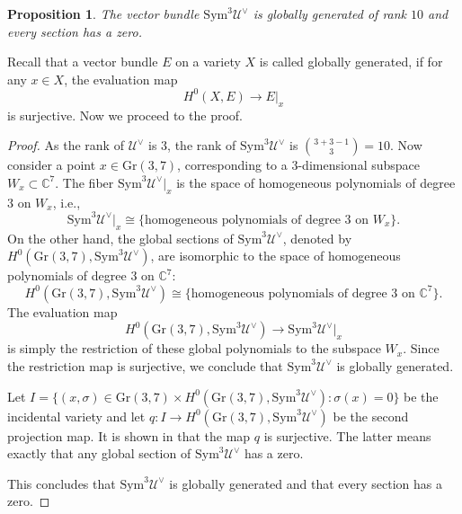 \documentclass{article}
\newtheorem{proposition}[theorem]{Proposition}
\theoremstyle{definition}
\begin{document}
\begin{proposition}\label{PropSym3UdualGloballyGenerated}
     The vector bundle $\mathrm{Sym}^3\mathcal U^\vee$ is {globally generated} of rank $10$ and every section has a zero.
\end{proposition}
Recall that a vector bundle $E$ on a variety $X$ is called globally generated, if for any $x\in X$, the evaluation map 
\[
H^0(X, E) \to E|_x
\]
is surjective. Now we proceed to the proof.
\begin{proof} As the rank of $\mathcal U^\vee$ is $3$, the rank of $\mathrm{Sym}^3\mathcal U^\vee$ is $\binom{3+3-1}{3}=10$.
Now consider a point \( x \in \mathrm{Gr}(3, 7) \), corresponding to a 3-dimensional subspace \( W_x \subset \mathbb{C}^7 \). The fiber \( \mathrm{Sym}^3 \mathcal{U}^\vee |_x \) is the space of homogeneous polynomials of degree 3 on \( W_x \), i.e.,
\[
\mathrm{Sym}^3 \mathcal{U}^\vee |_x \cong \{ \text{homogeneous polynomials of degree 3 on } W_x \}.
\]
On the other hand, the global sections of \( \mathrm{Sym}^3 \mathcal{U}^\vee \), denoted by \( H^0(\mathrm{Gr}(3,7), \mathrm{Sym}^3 \mathcal{U}^\vee) \), are isomorphic to the space of homogeneous polynomials of degree 3 on \( \mathbb{C}^7 \):
\[
H^0(\mathrm{Gr}(3,7), \mathrm{Sym}^3 \mathcal{U}^\vee) \cong \{ \text{homogeneous polynomials of degree 3 on } \mathbb{C}^7 \}.
\]
The evaluation map
\[
H^0(\mathrm{Gr}(3,7), \mathrm{Sym}^3 \mathcal{U}^\vee) \to \mathrm{Sym}^3 \mathcal{U}^\vee |_x
\]
is simply the restriction of these global polynomials to the subspace \( W_x \). Since the restriction map is surjective, we conclude that $\mathrm{Sym}^3\mathcal U^\vee$ is  globally generated.

Let $I = \{ (x, \sigma)\in \mathrm{Gr}(3, 7)\times H^0(\mathrm{Gr}(3, 7), \mathrm{Sym}^3\mathcal U^\vee): \sigma(x) = 0\}$ be the incidental variety and let $q: I\to H^0(\mathrm{Gr}(3, 7), \mathrm{Sym}^3\mathcal U^\vee)$ be the second projection map. It is shown in 
\cite[Proposition 2.1]{Borcea} that the map $q$ is surjective. The latter means exactly that any global section of $\mathrm{Sym}^3\mathcal U^\vee$ has a zero.

This concludes that \( \mathrm{Sym}^3 \mathcal{U}^\vee \) is globally generated and that every section has a zero.

\end{proof}
\end{document}
